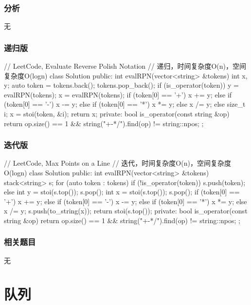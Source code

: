 \subsubsection{分析}
无


\subsubsection{递归版}
\begin{Code}
// LeetCode, Evaluate Reverse Polish Notation
// 递归，时间复杂度O(n)，空间复杂度O(logn)
class Solution {
public:
    int evalRPN(vector<string> &tokens) {
        int x, y;
        auto token = tokens.back();  tokens.pop_back();
        if (is_operator(token))  {
            y = evalRPN(tokens);
            x = evalRPN(tokens);
            if (token[0] == '+')       x += y;
            else if (token[0] == '-')  x -= y;
            else if (token[0] == '*')  x *= y;
            else                       x /= y;
        } else  {
            size_t i;
            x = stoi(token, &i);
        }
        return x;
    }
private:
    bool is_operator(const string &op) {
        return op.size() == 1 && string("+-*/").find(op) != string::npos;
    }
};
\end{Code}


\subsubsection{迭代版}
\begin{Code}
// LeetCode, Max Points on a Line
// 迭代，时间复杂度O(n)，空间复杂度O(logn)
class Solution {
public:
    int evalRPN(vector<string> &tokens) {
        stack<string> s;
        for (auto token : tokens) {
            if (!is_operator(token)) {
                s.push(token);
            } else {
                int y = stoi(s.top());
                s.pop();
                int x = stoi(s.top());
                s.pop();
                if (token[0] == '+')       x += y;
                else if (token[0] == '-')  x -= y;
                else if (token[0] == '*')  x *= y;
                else                       x /= y;
                s.push(to_string(x));
            }
        }
        return stoi(s.top());
    }
private:
    bool is_operator(const string &op) {
        return op.size() == 1 && string("+-*/").find(op) != string::npos;
    }
};
\end{Code}


\subsubsection{相关题目}
\begindot
\item 无
\myenddot


\section{队列} %

